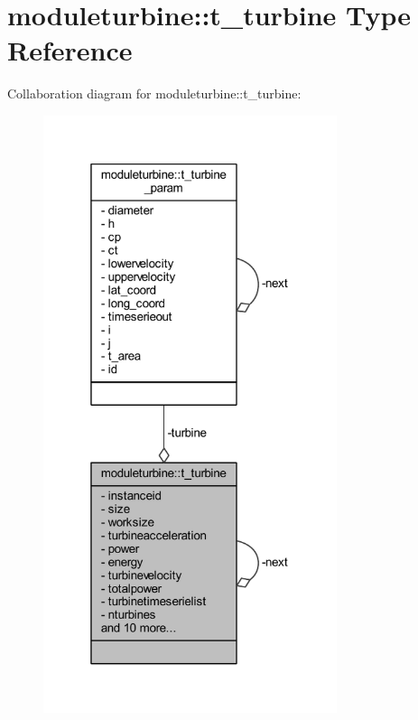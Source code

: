 \hypertarget{structmoduleturbine_1_1t__turbine}{}\section{moduleturbine\+:\+:t\+\_\+turbine Type Reference}
\label{structmoduleturbine_1_1t__turbine}


Collaboration diagram for moduleturbine\+:\+:t\+\_\+turbine\+:\nopagebreak
\begin{figure}[H]
\begin{center}
\leavevmode
\includegraphics[width=244pt]{structmoduleturbine_1_1t__turbine__coll__graph}
\end{center}
\end{figure}
